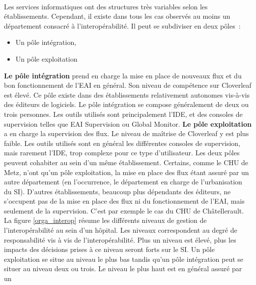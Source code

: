 			\paragraph{}%
			Les services informatiques ont des structures très variables selon les
			établissements. Cependant, il existe dans tous les cas observés au moins un
			département consacré à l’interopérabilité. Il peut se subdiviser
			en deux pôles~:
			\begin{itemize}
			  \item Un pôle intégration,
			  \item Un pôle exploitation
			\end{itemize}
			\textbf{Le pôle intégration} prend en charge la mise en place de nouveaux
			flux et du bon fonctionnement de l’EAI en général. Son niveau de compétence sur
			Cloverleaf est élevé. Ce pôle existe dans des établissements
			relativement autonomes vis-à-vis des éditeurs de logiciels. Le pôle
			intégration se compose généralement de deux ou trois personnes. Les outils
			utilisés sont principalement l’IDE, et des consoles de supervision telles que EAI
			Supervision ou Global Monitor.\newline
			\textbf{Le pôle exploitation} a en charge la supervision des flux. Le niveau
			de maîtrise de Cloverleaf y est plus faible. Les outils utilisés sont en
			général les différentes consoles de supervision,
			mais rarement l’IDE, trop complexe pour ce type d’utilisateur.\newline
			Les deux pôles peuvent cohabiter au sein d’un même établissement. Certains,
			comme le CHU de Metz, n’ont qu’un pôle exploitation, la mise en place des
			flux étant assuré par un autre département (en l’occurrence, le département
			en charge de l’urbanisation du SI). D’autres établissements, beaucoup plus
			dépendants des éditeurs, ne s’occupent pas de la mise en place des flux ni
			du fonctionnement de l’EAI, mais seulement de la supervision. C’est par
			exemple le cas du CHU de Châtellerault.\newline 
			La figure \ref{orga_interop} résume les
			différents niveaux de gestion de l’interopérabilité au sein d’un hôpital.
			Les niveaux correspondent au degré de responsabilité vis à vis de
			l'interopérabilité. Plus un niveau est élevé, plus les impacts des
			décisions prises à ce niveau seront forts sur le SI. Un pôle exploitation se
			situe au niveau le plus bas tandis qu’un pôle intégration peut se situer au
			niveau deux ou trois. Le niveau le plus haut est en général assuré par un
